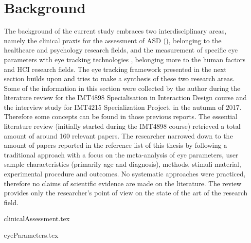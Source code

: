 \chapter{Background}
\label{chap:background}

The background of the current study embraces two interdisciplinary areas, namely the clinical praxis for the assessment of ASD (), belonging to the healthcare and psychology research fields, and the measurement of specific eye parameters with eye tracking technologies , belonging more to the human factors and HCI research fields. The eye tracking framework presented in the next section  builds upon and tries to make a synthesis of these two research areas.
Some of the information in this section were collected by the author during the literature review for the IMT4898 Specialisation in Interaction Design course and the interview study for IMT4215 Specialization Project, in the autumn of 2017. Therefore some concepts can be found in those previous reports.
The essential literature review (initially started during the IMT4898 course) retrieved a total amount of around 160 relevant papers. The researcher narrowed down to the amount of papers reported in the reference list of this thesis by following a traditional approach \citep[pp. 74-76]{jesson2011literaturereview} with a focus on the meta-analysis of eye parameters, user sample characteristics (primarily age and diagnosis), methods, stimuli material, experimental procedure and outcomes. No systematic approaches were practiced, therefore no claims of scientific evidence are made on the literature. The review provides only the researcher's point of view on the state of the art of the research field.


{clinicalAssessment.tex}

{eyeParameters.tex}




